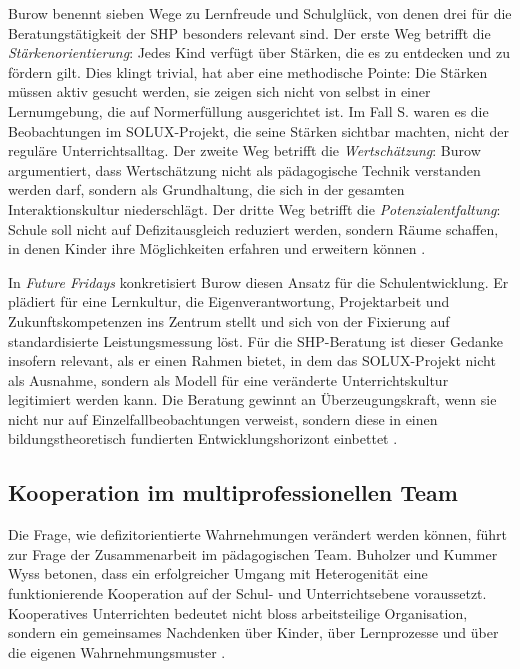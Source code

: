 \documentclass[ngerman, a4paper]{article}
\begin{document}
Burow benennt sieben Wege zu Lernfreude und Schulglück, von denen drei für die
Beratungstätigkeit der SHP besonders relevant sind. Der erste Weg betrifft die
\textit{Stärkenorientierung}: Jedes Kind verfügt über Stärken, die es zu entdecken
und zu fördern gilt. Dies klingt trivial, hat aber eine methodische Pointe: Die
Stärken müssen aktiv gesucht werden, sie zeigen sich nicht von selbst in einer
Lernumgebung, die auf Normerfüllung ausgerichtet ist. Im Fall S. waren es die
Beobachtungen im SOLUX-Projekt, die seine Stärken sichtbar machten, nicht der
reguläre Unterrichtsalltag. Der zweite Weg betrifft die \textit{Wertschätzung}:
Burow argumentiert, dass Wertschätzung nicht als pädagogische Technik verstanden
werden darf, sondern als Grundhaltung, die sich in der gesamten Interaktionskultur
niederschlägt. Der dritte Weg betrifft die \textit{Potenzialentfaltung}: Schule soll
nicht auf Defizitausgleich reduziert werden, sondern Räume schaffen, in denen
Kinder ihre Möglichkeiten erfahren und erweitern können
\parencite{burow2021positive}.

In \textit{Future Fridays} konkretisiert Burow diesen Ansatz für die Schulentwicklung.
Er plädiert für eine Lernkultur, die Eigenverantwortung, Projektarbeit und
Zukunftskompetenzen ins Zentrum stellt und sich von der Fixierung auf standardisierte
Leistungsmessung löst. Für die SHP-Beratung ist dieser Gedanke insofern relevant,
als er einen Rahmen bietet, in dem das SOLUX-Projekt nicht als Ausnahme, sondern
als Modell für eine veränderte Unterrichtskultur legitimiert werden kann. Die
Beratung gewinnt an Überzeugungskraft, wenn sie nicht nur auf Einzelfallbeobachtungen
verweist, sondern diese in einen bildungstheoretisch fundierten Entwicklungshorizont
einbettet \parencite{burow2020future}.

\subsection{Kooperation im multiprofessionellen Team}

Die Frage, wie defizitorientierte Wahrnehmungen verändert werden können, führt zur
Frage der Zusammenarbeit im pädagogischen Team. Buholzer und Kummer Wyss betonen,
dass ein erfolgreicher Umgang mit Heterogenität eine funktionierende Kooperation
auf der Schul- und Unterrichtsebene voraussetzt. Kooperatives Unterrichten bedeutet
nicht bloss arbeitsteilige Organisation, sondern ein gemeinsames Nachdenken über
Kinder, über Lernprozesse und über die eigenen Wahrnehmungsmuster
\parencite{buholzer2010allegleich}.
\end{document}

